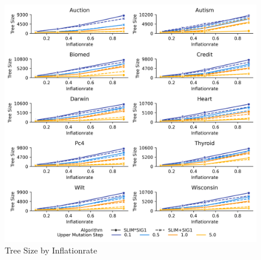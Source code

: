 
    \begin{figure}[H]
    \centering
    \includegraphics[width=\linewidth]{../Latex/Chapters/Figures/Results/inflationrate_tree_size_by_p_inflate.png}
    \caption{Tree Size by Inflationrate}
    \label{fig:inflationrate_tree_size_by_p_inflate}
    \end{figure}
    